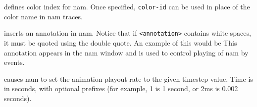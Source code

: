 defines color index for nam. Once
specified, {\tt color-id} can be used in place of the color name in
nam traces.

inserts an annotation in nam. Notice that if {\tt <annotation>} 
contains white spaces, it must be quoted using the double quote.
An example of this would be
This annotation appears in the nam window and is used to control
playing of nam by events. 

causes nam to set the animation playout rate to
the given timestep value.
Time is in seconds, with optional prefixes (for example, 1 is 1 second, or 2ms is 0.002 seconds).


